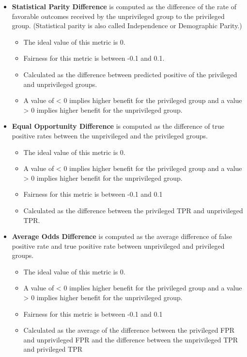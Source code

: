 \documentclass[assignment03_Solutions]{subfiles}
\begin{document}
\begin{itemize}
    \item \textbf{Statistical Parity Difference} is computed as the difference of the rate of favorable outcomes received by the unprivileged group to the privileged group. (Statistical parity is also called Independence or Demographic Parity.)
    \begin{itemize}
        \item The ideal value of this metric is 0.
        \item Fairness for this metric is between -0.1 and 0.1.
        \item Calculated as the difference between predicted positive of the privileged and unprivileged groups.
        \item A value of < 0 implies higher benefit for the privileged group and a value > 0 implies higher benefit for the unprivileged group.
    \end{itemize}
    \item \textbf{Equal Opportunity Difference} is computed as the difference of true positive rates between the unprivileged and the privileged groups.
    \begin{itemize}
        \item The ideal value of this metric is 0.
        \item A value of < 0 implies higher benefit for the privileged group and a value > 0 implies higher benefit for the unprivileged group.
        \item Fairness for this metric is between -0.1 and 0.1
        \item Calculated as the difference between the privileged TPR and unprivileged TPR.
    \end{itemize}
    \item \textbf{Average Odds Difference} is computed as the average difference of false positive rate and true positive rate between unprivileged and privileged groups. %
    \begin{itemize}
        \item The ideal value of this metric is 0.
        \item A value of < 0 implies higher benefit for the privileged group and a value > 0 implies higher benefit for the unprivileged group.
        \item Fairness for this metric is between -0.1 and 0.1
        \item Calculated as the average of the difference between the privileged FPR and unprivileged FPR and the difference between the unprivileged TPR and privileged TPR

\end{itemize}
\end{itemize}
\end{document}

